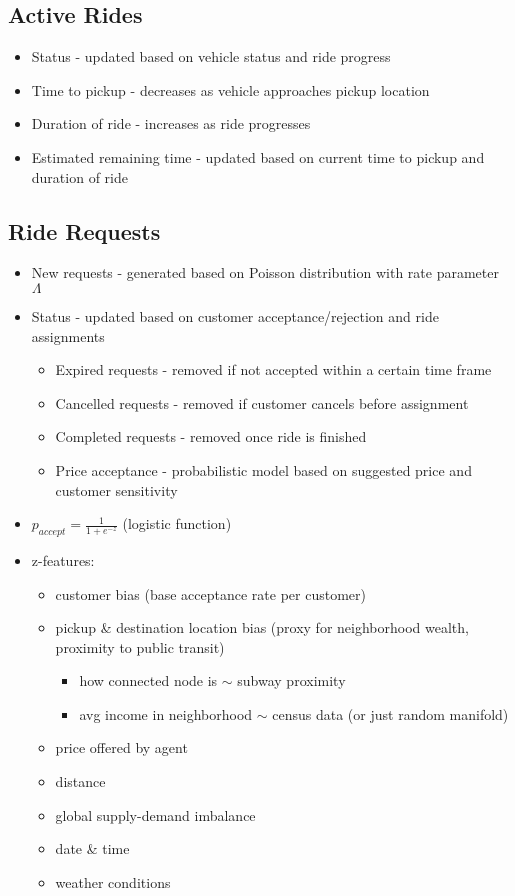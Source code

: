 \documentclass[12pt]{article}
\begin{document}
\subsection*{Active Rides}
\begin{itemize}
		\item Status - updated based on vehicle status and ride progress
		\item Time to pickup - decreases as vehicle approaches pickup location
		\item Duration of ride - increases as ride progresses
		\item Estimated remaining time - updated based on current time to pickup and duration of ride
\end{itemize}
\subsection*{Ride Requests}
\begin{itemize}
		\item New requests - generated based on Poisson distribution with rate parameter $\Lambda$
		\item Status - updated based on customer acceptance/rejection and ride assignments
				\begin{itemize}
						\item Expired requests - removed if not accepted within a certain time frame
						\item Cancelled requests - removed if customer cancels before assignment
						\item Completed requests - removed once ride is finished
						\item Price acceptance - probabilistic model based on suggested price and customer sensitivity
				\end{itemize}
		\item $p_{accept} = \tfrac{1}{1 + e^{-z}}$ (logistic function)
		\item z-features:
				\begin{itemize}
						\item customer bias (base acceptance rate per customer)
						\item pickup \& destination location bias (proxy for neighborhood wealth, proximity
								to public transit)
								\begin{itemize}
										\item how connected node is $\sim$ subway proximity
										\item avg income in neighborhood $\sim$ census data (or just random manifold)
								\end{itemize}
						\item price offered by agent
						\item distance
						\item global supply-demand imbalance
						\item date \& time
						\item weather conditions
				\end{itemize}
\end{itemize}
\end{document}
